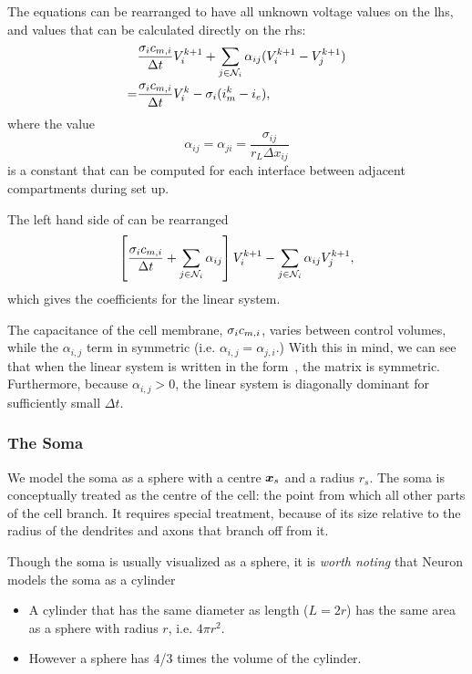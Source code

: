 The equations can be rearranged to have all unknown voltage values on the lhs, and values that can be calculated directly on the rhs:
\begin{align}
    & \frac{\sigma_i c_{m,i}}{\Delta t} V_i^{k+1} + \sum_{j\in\mathcal{N}_i} {\alpha_{ij} (V_i^{k+1}-V_j^{k+1})}
            \nonumber \\
    = & \frac{\sigma_i c_{m,i}}{\Delta t} V_i^k -  \sigma_i(i_m^{k} - i_e),
    \label{eq:ode_linsys}
\end{align}
where the value
\begin{equation}
    \alpha_{ij} = \alpha_{ji} = \frac{\sigma_{ij}}{ r_L \Delta x_{ij}}
    \label{eq:alpha_linsys}
\end{equation}
is a constant that can be computed for each interface between adjacent compartments during set up.

The left hand side of  can be rearranged
\begin{equation}
    \left[ \frac{\sigma_i c_{m,i}}{\Delta t} + \sum_{j\in\mathcal{N}_i} {\alpha_{ij}} \right] V_i^{k+1}
    - \sum_{j\in\mathcal{N}_i} { \alpha_{ij} V_j^{k+1}},
    \label{eq:rhs_linsys}
\end{equation}
which gives the coefficients for the linear system.

The capacitance of the cell membrane, $\sigma_i c_{m,i}$, varies between control volumes, while the $\alpha_{i,j}$ term in symmetric (i.e. $\alpha_{i,j}=\alpha_{j,i}$.)
With this in mind, we can see that when the linear system is written in the form~, the matrix is symmetric.
Furthermore, because $\alpha_{i,j} > 0$, the linear system is diagonally dominant for sufficiently small $\Delta t$.

\subsubsection{The Soma}
We model the soma as a sphere with a centre $\bm{x}_s$ and a radius $r_s$.
The soma is conceptually treated as the centre of the cell: the point from which all other parts of the cell branch.
It requires special treatment, because of its size relative to the radius of the dendrites and axons that branch off from it.

Though the soma is usually visualized as a sphere, it is \emph{worth noting} that Neuron models the soma as a cylinder
\begin{itemize}
    \item A cylinder that has the same diameter as length ($L=2r$) has the same area as a sphere with radius $r$, i.e. $4\pi r^2$.
    \item However a sphere has 4/3 times the volume of the cylinder.
\end{itemize}

